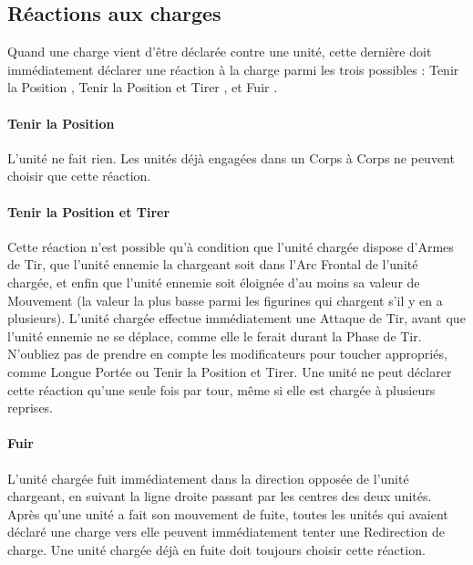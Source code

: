 \newpage
\hypertarget{chargereaction}{\subsection{Réactions aux charges}}
\label{chargereaction}

Quand une charge vient d'être déclarée contre une unité, cette dernière doit immédiatement déclarer une réaction à la charge parmi les trois possibles : \og Tenir la Position \fg{}, \og Tenir la Position et Tirer \fg{}, et \og Fuir \fg{}.

\paragraph{Tenir la Position}

L'unité ne fait rien. Les unités déjà engagées dans un Corps à Corps ne peuvent choisir que cette réaction.

\paragraph{Tenir la Position et Tirer}

Cette réaction n'est possible qu'à condition que l'unité chargée dispose d'Armes de Tir, que l'unité ennemie la chargeant soit dans l'Arc Frontal de l'unité chargée, et enfin que l'unité ennemie soit éloignée d'au moins sa valeur de Mouvement (la valeur la plus basse parmi les figurines qui chargent s'il y en a plusieurs). L'unité chargée effectue immédiatement une Attaque de Tir, avant que l'unité ennemie ne se déplace, comme elle le ferait durant la Phase de Tir. N'oubliez pas de prendre en compte les modificateurs pour toucher appropriés, comme Longue Portée ou Tenir la Position et Tirer. Une unité ne peut déclarer cette réaction qu'une seule fois par tour, même si elle est chargée à plusieurs reprises.

\paragraph{Fuir}

L'unité chargée fuit immédiatement dans la direction opposée de l'unité chargeant, en suivant la ligne droite passant par les centres des deux unités. Après qu'une unité a fait son mouvement de fuite, toutes les unités qui avaient déclaré une charge vers elle peuvent immédiatement tenter une Redirection de charge. Une unité chargée déjà en fuite doit toujours choisir cette réaction.

